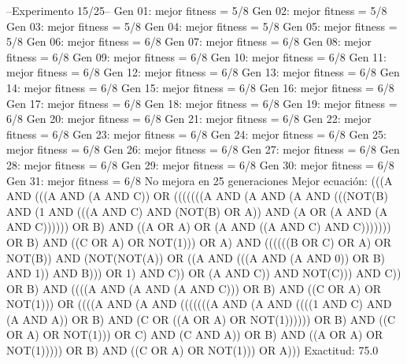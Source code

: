 --Experimento 
 15/25--
Gen 01: mejor fitness = 5/8
Gen 02: mejor fitness = 5/8
Gen 03: mejor fitness = 5/8
Gen 04: mejor fitness = 5/8
Gen 05: mejor fitness = 5/8
Gen 06: mejor fitness = 6/8
Gen 07: mejor fitness = 6/8
Gen 08: mejor fitness = 6/8
Gen 09: mejor fitness = 6/8
Gen 10: mejor fitness = 6/8
Gen 11: mejor fitness = 6/8
Gen 12: mejor fitness = 6/8
Gen 13: mejor fitness = 6/8
Gen 14: mejor fitness = 6/8
Gen 15: mejor fitness = 6/8
Gen 16: mejor fitness = 6/8
Gen 17: mejor fitness = 6/8
Gen 18: mejor fitness = 6/8
Gen 19: mejor fitness = 6/8
Gen 20: mejor fitness = 6/8
Gen 21: mejor fitness = 6/8
Gen 22: mejor fitness = 6/8
Gen 23: mejor fitness = 6/8
Gen 24: mejor fitness = 6/8
Gen 25: mejor fitness = 6/8
Gen 26: mejor fitness = 6/8
Gen 27: mejor fitness = 6/8
Gen 28: mejor fitness = 6/8
Gen 29: mejor fitness = 6/8
Gen 30: mejor fitness = 6/8
Gen 31: mejor fitness = 6/8
No mejora en 25 generaciones
Mejor ecuación: (((A AND (((A AND (A AND C)) OR (((((((A AND (A AND (A AND (((NOT(B) AND (1 AND (((A AND C) AND (NOT(B) OR A)) AND (A OR (A AND (A AND C)))))) OR B) AND ((A OR A) OR (A AND ((A AND C) AND C))))))) OR B) AND ((C OR A) OR NOT(1))) OR A) AND ((((((B OR C) OR A) OR NOT(B)) AND (NOT(NOT(A)) OR ((A AND (((A AND (A AND 0)) OR B) AND 1)) AND B))) OR 1) AND C)) OR (A AND C)) AND NOT(C))) AND C)) OR B) AND ((((A AND (A AND (A AND C))) OR B) AND ((C OR A) OR NOT(1))) OR ((((A AND (A AND (((((((A AND (A AND ((((1 AND C) AND (A AND A)) OR B) AND (C OR ((A OR A) OR NOT(1)))))) OR B) AND ((C OR A) OR NOT(1))) OR C) AND (C AND A)) OR B) AND ((A OR A) OR NOT(1))))) OR B) AND ((C OR A) OR NOT(1))) OR A)))
 Exactitud: 75.0%

